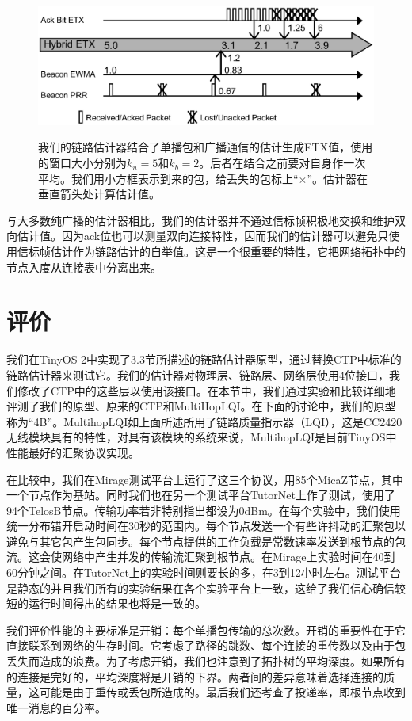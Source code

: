 \documentclass[12pt,a4paper]{article}
\begin{document}
\begin{figure}[ht]
\centering
\includegraphics[scale=0.5]{figures/fig5}\label{fig5}
\caption{我们的链路估计器结合了单播包和广播通信的估计生成ETX值，使用的窗口大小分别为$k_u=5$和$k_b=2$。后者在结合之前要对自身作一次平均。我们用小方框表示到来的包，给丢失的包标上“$\times$”。估计器在垂直箭头处计算估计值。}
\end{figure}

与大多数纯广播的估计器相比，我们的估计器并不通过信标帧积极地交换和维护双向估计值。因为ack位也可以测量双向连接特性，因而我们的估计器可以避免只使用信标帧估计作为链路估计的自举值。这是一个很重要的特性，它把网络拓扑中的节点入度从连接表中分离出来。

\section{评价}

我们在TinyOS 2中实现了3.3节所描述的链路估计器原型，通过替换CTP中标准的链路估计器来测试它。我们的估计器对物理层、链路层、网络层使用4位接口，我们修改了CTP中的这些层以使用该接口。在本节中，我们通过实验和比较详细地评测了我们的原型、原来的CTP和MultiHopLQI。在下面的讨论中，我们的原型称为“4B”。MultihopLQI如上面所述所用了链路质量指示器（LQI），这是CC2420无线模块具有的特性，对具有该模块的系统来说，MultihopLQI是目前TinyOS中性能最好的汇聚协议实现。

在比较中，我们在Mirage测试平台上运行了这三个协议，用85个MicaZ节点，其中一个节点作为基站。同时我们也在另一个测试平台TutorNet上作了测试，使用了94个TelosB节点。传输功率若非特别指出都设为0dBm。在每个实验中，我们使用统一分布错开启动时间在30秒的范围内。每个节点发送一个有些许抖动的汇聚包以避免与其它包产生包同步。每个节点提供的工作负载是常数速率发送到根节点的包流。这会使网络中产生并发的传输流汇聚到根节点。在Mirage上实验时间在40到60分钟之间。在TutorNet上的实验时间则要长的多，在3到12小时左右。测试平台是静态的并且我们所有的实验结果在各个实验平台上一致，这给了我们信心确信较短的运行时间得出的结果也将是一致的。

我们评价性能的主要标准是{\kai 开销}：每个单播包传输的总次数。开销的重要性在于它直接联系到网络的生存时间。它考虑了路径的跳数、每个连接的重传数以及由于包丢失而造成的浪费。为了考虑开销，我们也注意到了拓扑树的平均深度。如果所有的连接是完好的，平均深度将是开销的下界。两者间的差异意味着选择连接的质量，这可能是由于重传或丢包所造成的。最后我们还考查了投递率，即根节点收到唯一消息的百分率。
\end{document}

